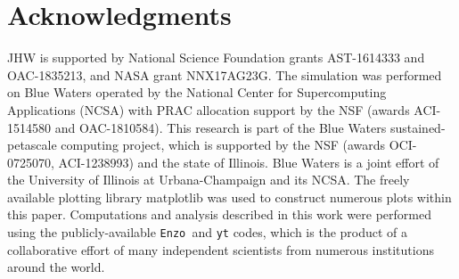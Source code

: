 \documentclass[graphics, twocolumn, usenatbib]{mn2e}
\newcommand{\enzo}{\texttt{Enzo~}}
\newcommand{\yt}{\texttt{yt}}
\begin{document}
\section*{Acknowledgments}

JHW is supported by National Science Foundation grants AST-1614333 and
OAC-1835213, and NASA grant NNX17AG23G.  The simulation was performed on Blue
Waters operated by the National Center for Supercomputing Applications (NCSA)
with PRAC allocation support by the NSF (awards ACI-1514580 and OAC-1810584).
This research is part of the Blue Waters sustained-petascale computing project, which
is supported by the NSF (awards OCI-0725070, ACI-1238993) and the state of
Illinois. Blue Waters is a joint effort of the University of Illinois at
Urbana-Champaign and its NCSA.  The freely available plotting library {\sc
matplotlib} \citep{matplotlib} was used to construct numerous plots within this
paper. Computations and analysis described in this work were performed using the
publicly-available \enzo and \yt{} \citep{YT} codes, which is the product of a
collaborative effort of many independent scientists from numerous institutions
around the world.



\end{document}
